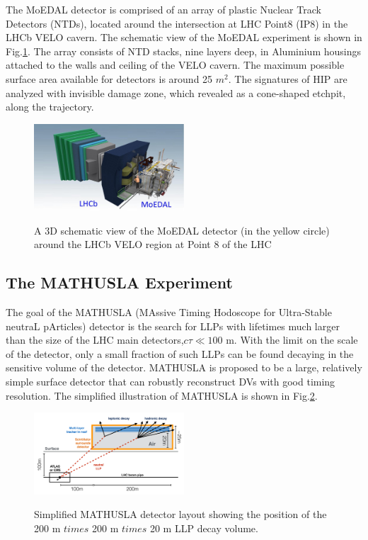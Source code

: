 The MoEDAL detector is comprised of an array of plastic Nuclear Track Detectors (NTDs), located around the intersection at LHC Point8 (IP8) in the LHCb VELO cavern. The schematic view of the MoEDAL experiment is shown in Fig.\ref{fig:MoEDALgeometry}. The array consists of NTD stacks, nine layers deep, in Aluminium housings attached to the walls and ceiling of the VELO cavern. The maximum possible surface area available for detectors is around 25 $m^2$. The signatures of HIP are analyzed with invisible damage zone, which revealed as a cone-shaped etchpit, along the trajectory.

\begin{figure}
    \centering
    \caption{A 3D schematic view of the MoEDAL detector (in the yellow circle) around the LHCb VELO region at Point 8 of the LHC}
    \includegraphics[width=0.5\textwidth]{fig/MoEDAL.png}
    \label{fig:MoEDALgeometry}
\end{figure}

\subsection{The MATHUSLA Experiment}
The goal of the MATHUSLA (MAssive Timing Hodoscope for Ultra-Stable neutraL pArticles) detector is the search for LLPs with lifetimes much larger than the size of the LHC main detectors,$c\tau \ll 100$ m. With the limit on the scale of the detector, only a small fraction of such LLPs can be found decaying in the sensitive volume of the detector. MATHUSLA is proposed to be a large, relatively simple surface detector that can robustly reconstruct DVs with good timing resolution. The simplified illustration of MATHUSLA is shown in Fig.\ref{fig:MATHUSLA}.

\begin{figure}
    \centering
    \caption{Simplified MATHUSLA detector layout showing the position of the 200 m $times$ 200 m $times$ 20 m LLP decay volume.}
    \includegraphics[width=0.5\textwidth]{fig/MATHUSLA.png}
    \label{fig:MATHUSLA}
\end{figure}

